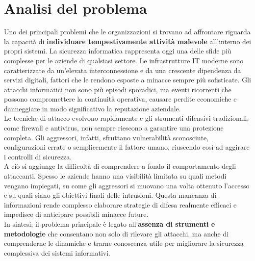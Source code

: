 \section{Analisi del problema}
Uno dei principali problemi che le organizzazioni si trovano ad affrontare riguarda la capacità di \textbf{individuare tempestivamente attività malevole} all'interno dei propri sistemi.  
La sicurezza informatica rappresenta oggi una delle sfide più complesse per le aziende di qualsiasi settore. Le infrastrutture IT moderne sono caratterizzate da un'elevata interconnessione e da una crescente dipendenza da servizi digitali, fattori che le rendono esposte a minacce sempre più sofisticate. Gli attacchi informatici non sono più episodi sporadici, ma eventi ricorrenti che possono compromettere la continuità operativa, causare perdite economiche e danneggiare in modo significativo la reputazione aziendale.\\
Le tecniche di attacco evolvono rapidamente e gli strumenti difensivi tradizionali, come firewall e antivirus, non sempre riescono a garantire una protezione completa. Gli aggressori, infatti, sfruttano vulnerabilità sconosciute, configurazioni errate o semplicemente il fattore umano, riuscendo così ad aggirare i controlli di sicurezza.\\  
A ciò si aggiunge la difficoltà di comprendere a fondo il comportamento degli attaccanti. Spesso le aziende hanno una visibilità limitata su quali metodi vengano impiegati, su come gli aggressori si muovano una volta ottenuto l'accesso e su quali siano gli obiettivi finali delle intrusioni. Questa mancanza di informazioni rende complesso elaborare strategie di difesa realmente efficaci e impedisce di anticipare possibili minacce future.\\
In sintesi, il problema principale è legato all'\textbf{assenza di strumenti e metodologie} che consentano non solo di rilevare gli attacchi, ma anche di comprenderne le dinamiche e trarne conoscenza utile per migliorare la sicurezza complessiva dei sistemi informativi.
